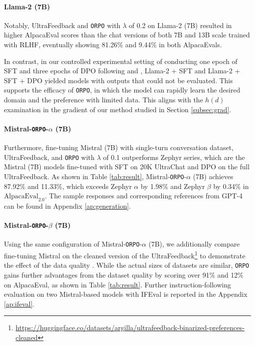 \paragraph{Llama-2 (7B)} Notably, UltraFeedback and \texttt{ORPO} with $\lambda$ of 0.2 on Llama-2 (7B) resulted in higher AlpacaEval scores than the chat versions of both 7B and 13B scale trained with RLHF, eventually showing 81.26\% and 9.44\% in both AlpacaEvals.

In contrast, in our controlled experimental setting of conducting one epoch of SFT and three epochs of DPO following \citet{tunstall2023zephyr} and \citet{rafailov2023direct}, Llama-2 + SFT and Llama-2 + SFT + DPO yielded models with outputs that could not be evaluated. This supports the efficacy of \texttt{ORPO}, in which the model can rapidly learn the desired domain and the preference with limited data. This aligns with the $h(d)$ examination in the gradient of our method studied in Section \ref{subsec:grad}.

\paragraph{Mistral-\texttt{ORPO}-$\alpha$ (7B)} Furthermore, fine-tuning Mistral (7B) with single-turn conversation dataset, UltraFeedback, and \texttt{ORPO} with $\lambda$ of 0.1 outperforms Zephyr series, which are the Mistral (7B) models fine-tuned with SFT on 20K UltraChat \citep{ding2023enhancing} and DPO on the full UltraFeedback. As shown in Table \ref{tab:result}, Mistral-\texttt{ORPO}-$\alpha$ (7B) achieves 87.92\% and 11.33\%, which exceeds Zephyr $\alpha$ by 1.98\% and Zephyr $\beta$ by 0.34\% in $\text{AlpacaEval}_{2.0}$. The sample responses and corresponding references from GPT-4 can be found in Appendix \ref{ap:generation}.

\paragraph{Mistral-\texttt{ORPO}-$\beta$ (7B)} Using the same configuration of Mistral-\texttt{ORPO}-$\alpha$ (7B), we additionally compare fine-tuning Mistral on the cleaned version of the UltraFeedback\footnote{\url{https://huggingface.co/datasets/argilla/ultrafeedback-binarized-preferences-cleaned}} to demonstrate the effect of the data quality \citep{notus2023}. While the actual sizes of datasets are similar, \texttt{ORPO} gains further advantages from the dataset quality by scoring over 91\% and 12\% on AlpacaEval, as shown in Table \ref{tab:result}. Further instruction-following evaluation on two Mistral-based models with IFEval \citep{zhou2023instructionfollowing} is reported in the Appendix \ref{ap:ifeval}.

